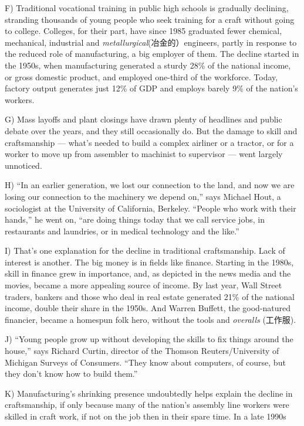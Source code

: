 \documentclass[UTF8,11pt]{ctexart}
\begin{document}
F) Traditional vocational training in public high schools is gradually declining, stranding thousands of young people who seek training for a craft without going to college. Colleges, for their part, have since 1985 graduated fewer chemical, mechanical, industrial and\textit{ metallurgical}(冶金的）engineers, partly in response to the reduced role of manufacturing, a big employer of them. The decline started in the 1950s, when manufacturing generated a sturdy 28\% of the national income, or gross domestic product, and employed one-third of the workforce. Today, factory output generates just 12\% of GDP and employs barely 9\% of the nation’s workers.


G) Mass layoffs and plant closings have drawn plenty of headlines and public debate over the years, and they still occasionally do. But the damage to skill and craftsmanship — what’s needed to build a complex airliner or a tractor, or for a worker to move up from assembler to machinist to supervisor — went largely unnoticed.


H) “In an earlier generation, we lost our connection to the land, and now we are losing our connection to the machinery we depend on,” says Michael Hout, a sociologist at the University of California, Berkeley. “People who work with their hands,” he went on, “are doing things today that we call service jobs, in restaurants and laundries, or in medical technology and the like.”


I) That’s one explanation for the decline in traditional craftsmanship. Lack of interest is another. The big money is in fields like finance. Starting in the 1980s, skill in finance grew in importance, and, as depicted in the news media and the movies, became a more appealing source of income. By last year, Wall Street traders, bankers and those who deal in real estate generated 21\% of the national income, double their share in the 1950s. And Warren Buffett, the good-natured financier, became a homespun folk hero, without the tools and\textit{ overalls} (工作服).


J) “Young people grow up without developing the skills to fix things around the house,” says Richard Curtin, director of the Thomson Reuters/University of Michigan Surveys of Consumers. “They know about computers, of course, but they don’t know how to build them.”


K) Manufacturing’s shrinking presence undoubtedly helps explain the decline in craftsmanship, if only because many of the nation’s assembly line workers were skilled in craft work, if not on the job then in their spare time. In a late 1990s
\end{document}
